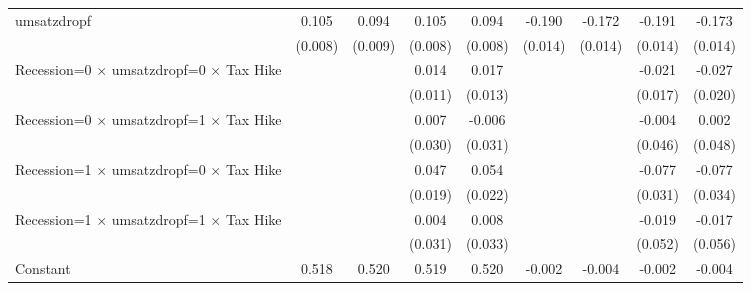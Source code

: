 {\begin{tabular}{l*{8}{c}}
umsatzdropf         &       0.105\sym{***}&       0.094\sym{***}&       0.105\sym{***}&       0.094\sym{***}&      -0.190\sym{***}&      -0.172\sym{***}&      -0.191\sym{***}&      -0.173\sym{***}\\
                    &     (0.008)         &     (0.009)         &     (0.008)         &     (0.008)         &     (0.014)         &     (0.014)         &     (0.014)         &     (0.014)         \\
Recession=0 $\times$ umsatzdropf=0 $\times$ Tax Hike&                     &                     &       0.014         &       0.017         &                     &                     &      -0.021         &      -0.027         \\
                    &                     &                     &     (0.011)         &     (0.013)         &                     &                     &     (0.017)         &     (0.020)         \\
Recession=0 $\times$ umsatzdropf=1 $\times$ Tax Hike&                     &                     &       0.007         &      -0.006         &                     &                     &      -0.004         &       0.002         \\
                    &                     &                     &     (0.030)         &     (0.031)         &                     &                     &     (0.046)         &     (0.048)         \\
Recession=1 $\times$ umsatzdropf=0 $\times$ Tax Hike&                     &                     &       0.047\sym{**} &       0.054\sym{**} &                     &                     &      -0.077\sym{**} &      -0.077\sym{**} \\
                    &                     &                     &     (0.019)         &     (0.022)         &                     &                     &     (0.031)         &     (0.034)         \\
Recession=1 $\times$ umsatzdropf=1 $\times$ Tax Hike&                     &                     &       0.004         &       0.008         &                     &                     &      -0.019         &      -0.017         \\
                    &                     &                     &     (0.031)         &     (0.033)         &                     &                     &     (0.052)         &     (0.056)         \\
Constant            &       0.518\sym{***}&       0.520\sym{***}&       0.519\sym{***}&       0.520\sym{***}&      -0.002         &      -0.004\sym{*}  &      -0.002         &      -0.004\sym{*}  \\

\end{tabular}}
